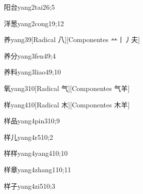 \begin{verbete}{阳台}{yang2tai2}{6;5}
\end{verbete}

\begin{verbete}{洋葱}{yang2cong1}{9;12}
\end{verbete}

\begin{verbete}{养}{yang3}{9}[Radical 八][Componentes 䒑丨丿夫]
\end{verbete}

\begin{verbete}{养分}{yang3fen4}{9;4}
\end{verbete}

\begin{verbete}{养料}{yang3liao4}{9;10}
\end{verbete}

\begin{verbete}{氧}{yang3}{10}[Radical 气][Componentes 气羊]
\end{verbete}

\begin{verbete}{样}{yang4}{10}[Radical 木][Componentes 木羊]
\end{verbete}

\begin{verbete}{样品}{yang4pin3}{10;9}
\end{verbete}

\begin{verbete}{样儿}{yang4r5}{10;2}
\end{verbete}

\begin{verbete}{样样}{yang4yang4}{10;10}
\end{verbete}

\begin{verbete}{样章}{yang4zhang1}{10;11}
\end{verbete}

\begin{verbete}{样子}{yang4zi5}{10;3}
\end{verbete}


